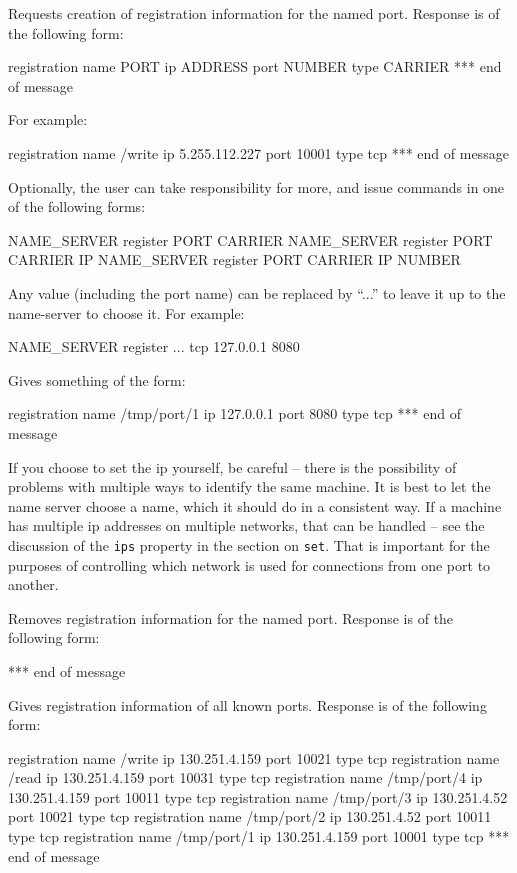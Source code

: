 \newusage{}

Requests creation of registration information for the named port.  
Response is of the following form:
\begin{code}
registration name PORT ip ADDRESS port NUMBER type CARRIER
*** end of message
\end{code}
For example:
\begin{code}
registration name /write ip 5.255.112.227 port 10001 type tcp
*** end of message
\end{code}
%
Optionally, the user can take responsibility for more, and 
issue commands in one of the following forms:
\begin{code}
NAME_SERVER register PORT CARRIER
NAME_SERVER register PORT CARRIER IP
NAME_SERVER register PORT CARRIER IP NUMBER
\end{code}
Any value (including the port name) can be replaced by ``...'' to leave it 
up to the name-server to choose it.  For example:
\begin{code}
NAME_SERVER register ... tcp 127.0.0.1 8080
\end{code}
Gives something of the form:
\begin{code}
registration name /tmp/port/1 ip 127.0.0.1 port 8080 type tcp
*** end of message
\end{code}
If you choose to set the ip yourself, be careful -- there is the 
possibility of problems with multiple ways to identify the same
machine.  It is best to let the name server choose a name,
which it should do in a consistent way.  If a machine has
multiple ip addresses on multiple networks, that can be 
handled -- see the 
discussion of the {\tt ips} property in the section on {\tt set}.
That is important for the purposes of controlling which 
network is used for connections from one port to another.




\newusage{}

Removes registration information for the named port.  
Response is of the following form:
\begin{code}
*** end of message
\end{code}


\newusage{}

Gives registration information of all known ports.
Response is of the following form:
\begin{code}
registration name /write ip 130.251.4.159 port 10021 type tcp
registration name /read ip 130.251.4.159 port 10031 type tcp
registration name /tmp/port/4 ip 130.251.4.159 port 10011 type tcp
registration name /tmp/port/3 ip 130.251.4.52 port 10021 type tcp
registration name /tmp/port/2 ip 130.251.4.52 port 10011 type tcp
registration name /tmp/port/1 ip 130.251.4.159 port 10001 type tcp
*** end of message
\end{code}



